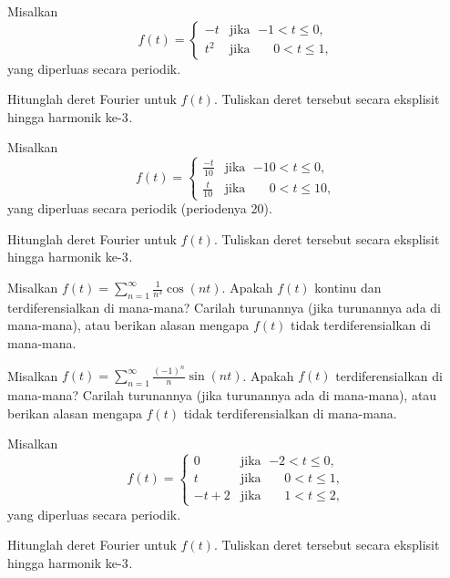 \begin{exercise}
Misalkan
\begin{equation*}
f(t) =
\begin{cases}
-t & \text{jika } \; {-1} < t \leq 0 , \\
t^2 & \text{jika } \; \phantom{-}0 < t \leq  1 ,
\end{cases}
\end{equation*}
yang diperluas secara periodik.
\begin{tasks}
\task Hitunglah deret Fourier untuk $f(t)$.
\task Tuliskan deret tersebut secara eksplisit hingga harmonik ke-$3^{\text{}}$.
\end{tasks}
\end{exercise}

\begin{exercise}
Misalkan
\begin{equation*}
f(t) =
\begin{cases}
\frac{-t}{10} & \text{jika } \; {-10} < t \leq 0 , \\
\frac{t}{10} & \text{jika } \; \phantom{-1}0 < t \leq  10 ,
\end{cases}
\end{equation*}
yang diperluas secara periodik (periodenya 20).
\begin{tasks}
\task Hitunglah deret Fourier untuk $f(t)$.
\task Tuliskan deret tersebut secara eksplisit hingga harmonik ke-$3^{\text{}}$.
\end{tasks}
\end{exercise}

\begin{exercise}
Misalkan $f(t) = \sum_{n=1}^\infty \frac{1}{n^3} \cos (n t)$.  Apakah $f(t)$
kontinu dan terdiferensialkan di mana-mana?  Carilah turunannya (jika turunannya ada
di mana-mana),
atau berikan alasan mengapa $f(t)$ tidak terdiferensialkan di mana-mana.
\end{exercise}

\begin{exercise}
Misalkan $f(t) = \sum_{n=1}^\infty \frac{{(-1)}^n}{n} \sin (n t)$.  Apakah $f(t)$
terdiferensialkan di mana-mana?  Carilah turunannya (jika turunannya ada di mana-mana), atau
berikan alasan mengapa $f(t)$ tidak terdiferensialkan di mana-mana.
\end{exercise}

\begin{exercise}
Misalkan
\begin{equation*}
f(t) =
\begin{cases}
0 & \text{jika } \; {-2} < t \leq 0, \\
t & \text{jika } \; \phantom{-}0 < t \leq 1, \\
-t+2 & \text{jika } \; \phantom{-}1 < t \leq 2,
\end{cases}
\end{equation*}
yang diperluas secara periodik.
\begin{tasks}
\task Hitunglah deret Fourier untuk $f(t)$.
\task Tuliskan deret tersebut secara eksplisit hingga harmonik ke-$3^{\text{}}$.
\end{tasks}
\end{exercise}


